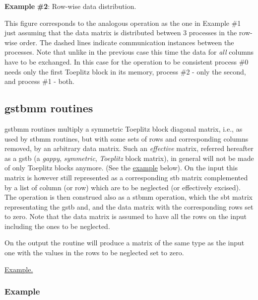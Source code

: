 {\bfseries Example} {\bfseries \#2}\-: Row-\/wise data distribution.



This figure corresponds to the analogous operation as the one in Example \#1 just assuming that the data matrix is distributed between 3 processes in the row-\/wise order. The dashed lines indicate communication instances between the processes. Note that unlike in the previous case this time the data for {\itshape all} columns have to be exchanged. In this case for the operation to be consistent process \#0 needs only the first Toeplitz block in its memory, process \#2 -\/ only the second, and process \#1 -\/ both. \subsection{gstbmm routines}\label{toeplitz_funct_gstbmm}
{\ttfamily gstbmm} routines multiply a symmetric Toeplitz block diagonal matrix, i.\-e., as used by {\ttfamily stbmm} routines, but with some sets of rows and corresponding columns removed, by an arbitrary data matrix. Such an {\itshape effective} matrix, referred hereafter as a {\ttfamily gstb} (a {\itshape gappy}, {\itshape symmetric}, {\itshape Toeplitz} block matrix), in general will not be made of only Toeplitz blocks anymore. (See the \hyperlink{toeplitz_funct_gstbmm_example}{example} below). On the input this matrix is however still represented as a corresponding {\ttfamily stb} matrix complemented by a list of column (or row) which are to be neglected (or effectively excised). The operation is then construed also as a {\ttfamily stbmm} operation, which the {\ttfamily sbt} matrix representating the {\ttfamily gstb} and, and the data matrix with the corresponding rows set to zero. Note that the data matrix is assumed to have all the rows on the input including the ones to be neglected.

On the output the routine will produce a matrix of the same type as the input one with the values in the rows to be neglected set to zero.

\hyperlink{toeplitz_funct_gstbmm_example}{Example.} \subsubsection{Example}\label{toeplitz_funct_gstbmm_example}


